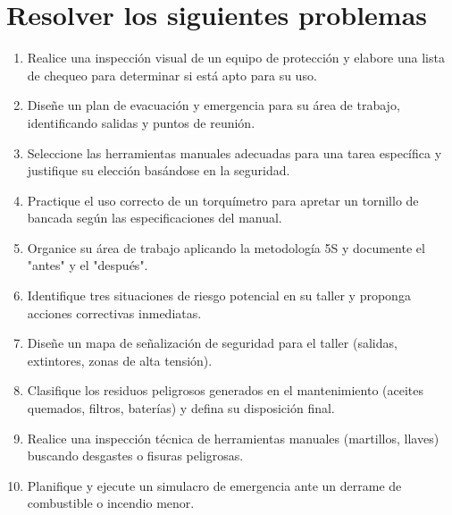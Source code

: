 \section*{\faWrench\space Resolver los siguientes problemas}
\begin{enumerate}
	\item Realice una inspección visual de un equipo de protección y elabore una
	      lista de chequeo para determinar si está apto para su uso.
	\item Diseñe un plan de evacuación y emergencia para su área de trabajo,
	      identificando salidas y puntos de reunión.
	\item Seleccione las herramientas manuales adecuadas para una tarea específica y
	      justifique su elección basándose en la seguridad.
	\item Practique el uso correcto de un torquímetro para apretar un tornillo de
	      bancada según las especificaciones del manual.
	\item Organice su área de trabajo aplicando la metodología 5S y documente el
	      "antes" y el "después".
	\item Identifique tres situaciones de riesgo potencial en su taller y proponga
	      acciones correctivas inmediatas.
	\item Diseñe un mapa de señalización de seguridad para el taller (salidas,
	      extintores, zonas de alta tensión).
	\item Clasifique los residuos peligrosos generados en el mantenimiento (aceites
	      quemados, filtros, baterías) y defina su disposición final.
	\item Realice una inspección técnica de herramientas manuales (martillos, llaves)
	      buscando desgastes o fisuras peligrosas.
	\item Planifique y ejecute un simulacro de emergencia ante un derrame de
	      combustible o incendio menor.
\end{enumerate}
